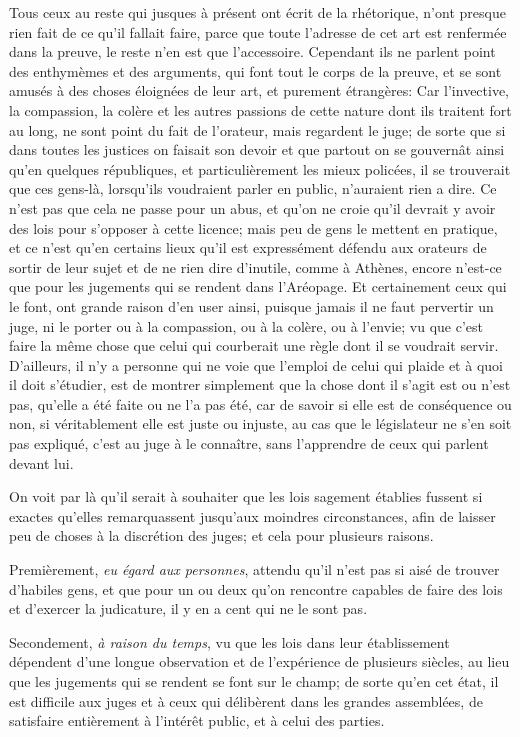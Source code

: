 Tous ceux au reste qui jusques à présent ont écrit de la rhétorique, n'ont presque rien fait de ce qu'il fallait faire, parce que
toute l'adresse de cet art est renfermée dans la preuve, le reste n'en est que l'accessoire. Cependant ils ne  parlent point des
enthymèmes et des arguments, qui font tout le corps de la preuve, et se sont amusés à des choses éloignées de leur art, et purement
étrangères: Car l'invective, la compassion, la colère et les autres passions de cette nature dont ils traitent fort au long, ne
sont point du fait de l'orateur, mais regardent le juge; de sorte que si dans toutes les justices on faisait son devoir et que
partout on se gouvernât ainsi qu'en quelques républiques, et particulièrement les mieux policées, il se trouverait que ces gens-là,
lorsqu'ils voudraient parler en public, n'auraient rien a dire. Ce n'est pas que cela ne passe pour un abus, et qu'on ne croie
qu'il devrait y avoir des lois pour s'opposer à cette licence; mais peu de gens le mettent en pratique, et ce n'est qu'en certains
lieux qu'il est expressément défendu aux orateurs de sortir de leur sujet et de ne rien dire d'inutile, comme à Athènes, encore
n'est-ce que pour les jugements qui se rendent dans l'Aréopage. Et certainement ceux qui le font, ont grande raison d'en user ainsi,
puisque jamais il ne faut pervertir un juge, ni le porter ou à la compassion, ou à la colère, ou à l'envie; vu que c'est faire la même
chose que  celui qui courberait une règle dont il se voudrait servir. D'ailleurs, il n'y a personne qui ne voie que l'emploi de celui
qui plaide et à quoi il doit s'étudier, est de montrer simplement que la chose dont il s'agit est ou n'est pas, qu'elle a été faite ou
ne l'a pas été, car de savoir si elle  est de conséquence ou non, si véritablement elle est juste ou injuste, au cas que le législateur
ne s'en soit pas expliqué, c'est au juge à le connaître, sans l'apprendre de ceux qui parlent devant lui. 

\medbreak

On voit par là qu'il serait à souhaiter que les lois sagement établies fussent si exactes qu'elles remarquassent jusqu'aux moindres
circonstances, afin de laisser peu de choses à la discrétion des juges; et cela pour plusieurs raisons.

Premièrement, \emph{eu égard aux personnes}, attendu qu'il n'est pas si aisé de trouver d'habiles gens, et que pour un ou deux qu'on
rencontre capables de faire des lois et d'exercer la judicature, il y  en a cent qui ne le sont pas.

Secondement, \emph{à raison du temps}, vu que les lois dans leur établissement dépendent d'une longue observation et de l'expérience de
plusieurs siècles, au lieu que les jugements qui se rendent se font sur le champ; de sorte qu'en cet état, il est difficile aux juges et
à ceux qui délibèrent dans les grandes assemblées, de satisfaire  entièrement à l'intérêt public, et à celui des parties.

